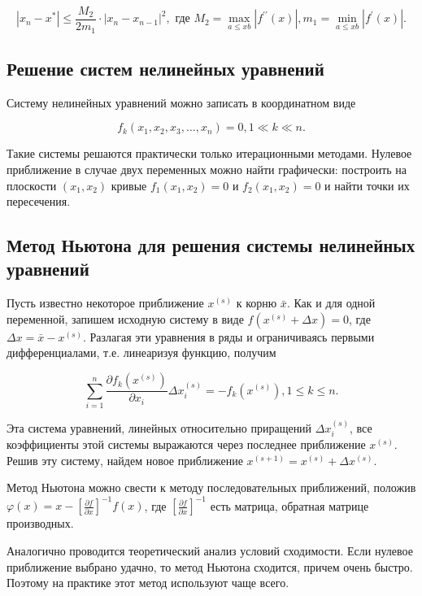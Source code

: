 \documentclass[a4paper,12pt]{article}
\begin{document}
$$
\left|x_{n}-x^{*}\right| \leq \frac{M_{2}}{2 m_{1}} \cdot\left|x_{n}-x_{n-1}\right|^{2}, \text { где } M_{2}=\max _{a \leq x b}\left|f^{\prime \prime}(x)\right|, m_{1}=\min _{a \leq x b}\left|f^{\prime}(x)\right| .
$$

\subsection{Решение систем нелинейных уравнений}

Систему нелинейных уравнений можно записать в координатном виде

$$
f_{k}\left(x_{1}, x_{2}, x_{3}, \ldots, x_{n}\right)=0,1 \ll k \ll n .
$$

Такие системы решаются практически только итерационными методами. Нулевое приближение в случае двух переменных можно найти графически: построить на плоскости $\left(x_{1}, x_{2}\right)$ кривые $f_{1}\left(x_{1}, x_{2}\right)=0$ и $f_{2}\left(x_{1}, x_{2}\right)=0$ и найти точки их пересечения.

\subsection{Метод Ньютона для решения системы нелинейных уравнений}

Пусть известно некоторое приближение $x^{(s)}$ к корню $\bar{x} .$ Как и для одной переменной, запишем исходную систему в виде $f\left(x^{(s)}+\Delta x\right)=0$, где $\Delta x=\bar{x}-x^{(s)}$. Разлагая эти уравнения в ряды и ограничиваясь первыми дифференциалами, т.е. линеаризуя функцию, получим

$$
\sum_{i=1}^{n} \frac{\partial f_{k}\left(x^{(s)}\right)}{\partial x_{i}} \Delta x_{i}^{(s)}=-f_{k}\left(x^{(s)}\right), 1 \leq k \leq n .
$$

Эта система уравнений, линейных относительно приращений $\Delta x_{i}^{(s)}$, все коэффициенты этой системы выражаются через последнее приближение $x^{(s)}$. Решив эту систему, найдем новое приближение $x^{(s+1)}=x^{(s)}+\Delta x^{(s)}$.

Метод Ньютона можно свести к методу последовательных приближений, положив $\varphi(x)=x-\left[\frac{\partial f}{\partial x}\right]^{-1} f(x)$, где $\left[\frac{\partial f}{\partial x}\right]^{-1}$ есть матрица, обратная матрице производных.

Аналогично проводится теоретический анализ условий сходимости. Если нулевое приближение выбрано удачно, то метод Ньютона сходится, причем очень быстро. Поэтому на практике этот метод используют чаще всего.
\end{document}
